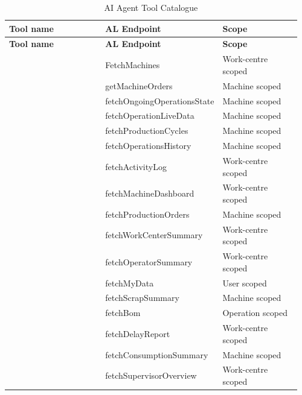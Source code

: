 \begin{longtable}{@{} P{0.35\linewidth} P{0.32\linewidth} P{0.29\linewidth} @{}}
	\caption{AI Agent Tool Catalogue}
	\label{tab:s5-tools}\\
	\toprule
	\textbf{Tool name} & \textbf{AL Endpoint} & \textbf{Scope} \\
	\midrule
	\endfirsthead
	\toprule
	\textbf{Tool name} & \textbf{AL Endpoint} & \textbf{Scope} \\
	\midrule
	\endhead
	
	\bottomrule
	\endlastfoot

	             & FetchMachines                    & Work-centre scoped \\ \midrule
	       & getMachineOrders                 & Machine scoped     \\ \midrule
	   & fetchOngoingOperationsState      & Machine scoped     \\ \midrule
	 & fetchOperationLiveData           & Machine scoped     \\ \midrule
	    & fetchProductionCycles            & Machine scoped     \\ \midrule
	   & fetchOperationsHistory           & Machine scoped     \\ \midrule
	         & fetchActivityLog                 & Work-centre scoped \\ \midrule
	    & fetchMachineDashboard            & Work-centre scoped \\ \midrule
	    & fetchProductionOrders            & Machine scoped     \\ \midrule
	 & fetchWorkCenterSummary           & Work-centre scoped \\ \midrule
	     & fetchOperatorSummary             & Work-centre scoped \\ \midrule
	              & fetchMyData                      & User scoped        \\ \midrule
	        & fetchScrapSummary                & Machine scoped     \\ \midrule
	                   & fetchBom                         & Operation scoped     \\ \midrule
	         & fetchDelayReport                 & Work-centre scoped \\ \midrule
	  & fetchConsumptionSummary          & Machine scoped     \\ \midrule
	  & fetchSupervisorOverview          & Work-centre scoped \\
\end{longtable}

